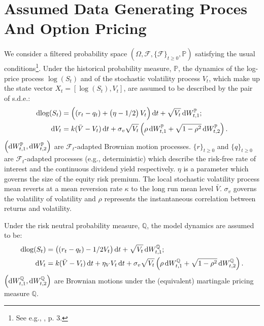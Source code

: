 \documentclass[11pt,a4paper,notitlepage]{article}
\numberwithin{equation}{section}
\begin{document}
\newpage
 
\section{Assumed Data Generating Proces And Option Pricing}
We consider a filtered probability space $\left(\Omega, \mathcal{F}, \lbrace\mathcal{F}\rbrace_{t\geq0}, \mathbb{P} \right)$ satisfying the usual conditions\footnote{See e.g., \citet{protterstochastic}, p. 3.}. Under the historical probability measure, $\mathbb{P}$, the dynamics of the log-price process $\log(S_t)$ and of the stochastic volatility process $V_t$, which make up the state vector $X_t = [\log(S_t), V_t]$, are assumed to be described by the pair of s.d.e.:
\begin{align}
	\dif{\log(S_t)} &= \left((r_t-q_t)+ \left(\eta-1/2\right) V_t \right)\dif t + \sqrt{V_t} \dif W_{t,1}^\mathbb{P}; \label{PHestonS}\\
	\dif{V_t} &= k(\bar{V}-V_t)\dif t + \sigma_v\sqrt{V_t}\left(\rho \dif W_{t,1}^\mathbb{P} + \sqrt{1-\rho^2}\dif W_{t,2}^\mathbb{P}\right). \label{PHestonV}
\end{align}
$\left(\dif W_{t,1}^\mathbb{P}, \dif W_{t,2}^\mathbb{P}\right)$ are $\mathcal{F}_t$-adapted Brownian motion processes. $\lbrace r \rbrace_{t\geq 0}$  and  $\lbrace q \rbrace_{t\geq 0}$ are $\mathcal{F}_t$-adapted processes (e.g., deterministic) which describe the risk-free rate of interest and the continuous dividend yield respectively. $\eta$ is a parameter which governs the size of the equity risk premium. The local stochastic volatility process mean reverts at a mean reversion rate $\kappa$ to the long run mean level $\bar{V}$. $\sigma_v$ governs the volatility of volatility and $\rho$ represents the instantaneous correlation between returns and volatility.

Under the risk neutral probability measure, $\mathbb{Q}$, the model dynamics are assumed to be: 
\begin{align}
	\dif{\log(S_t)} &= \left( (r_t-q_t) - 1/2 V_t\right) \dif t + \sqrt{V_t} \dif W_{t,1}^\mathbb{Q};\label{QHestonS}\\
	\dif{V_t} &= k(\bar{V}-V_t)\dif t + \eta_{V}V_t\dif t + \sigma_v\sqrt{V_t}\left(\rho \dif W_{t,1}^\mathbb{Q} + \sqrt{1-\rho^2}\dif W_{t,2}^\mathbb{Q}\right).\label{QHestonV}
\end{align}
$\left(\dif W_{t,1}^\mathbb{Q}, \dif W_{t,2}^\mathbb{Q}\right)$ are Brownian motions under the (equivalent) martingale pricing measure $\mathbb{Q}$.
\end{document}
